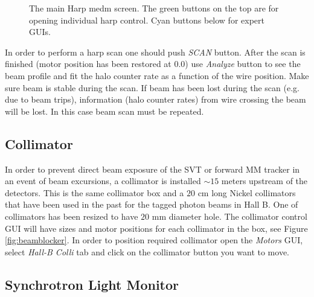 \documentclass[12pt]{article}
\begin{document}
\begin{figure}[tbhp]
{\centering {} \par}
\caption{The main Harp medm screen. The green buttons on the top are for opening individual harp control. Cyan buttons below for expert GUIs.}
\label{harpmain}
\end{figure}

In order to perform a harp scan one should push {\it SCAN} button. After the scan is finished (motor position has been restored at $0.0$) use {\it Analyze} button to see the beam profile and fit the halo counter rate as a function of the wire position. Make sure beam is stable during the scan. If beam has been lost during the scan (e.g. due to beam trips), information (halo counter rates) from wire crossing the beam will be lost. In this case beam scan must be repeated.  


\subsection{Collimator \label{sec:colim}}
\indent

In order to prevent direct beam exposure of the SVT or forward MM tracker in an event of beam excursions, a collimator is installed $\sim 15$ meters upstream of the detectors. This is the same collimator box and a $20$ cm long Nickel collimators that have been used in the past for the tagged photon beams in Hall B. One of collimators has been resized to have $20$ mm diameter hole. The collimator control GUI will have sizes and motor positions for each collimator in the box, see Figure \ref{fig:beamblocker}. In order to position required collimator open the {\it Motors} GUI, select {\it Hall-B Colli} tab and click on the collimator button you want to move.   

\subsection{Synchrotron Light Monitor \label{sec:slm}}
\indent
\end{document}
